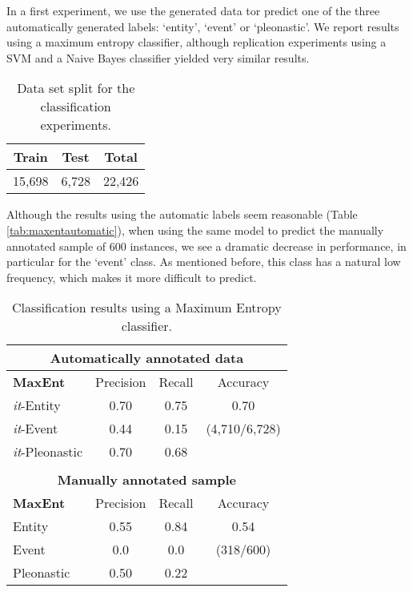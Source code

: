 \documentclass[10pt, a4paper]{article} \usepackage{lrec} \usepackage{multibib}
\begin{document}
In a first experiment, we use the generated data tor predict one of the three automatically generated labels: `entity', `event' or `pleonastic'. We report results using a maximum entropy classifier, although replication experiments using a SVM and a Naive Bayes classifier yielded very similar results. 


\begin{table}[h!]\centering
\begin{tabular}{ccc}
\toprule
\textbf{Train} & \textbf{Test} & \textbf{Total} \\
\midrule
15,698 & 6,728 & 22,426 \\
\bottomrule
\end{tabular}
\caption{Data set split for the classification experiments. }
\end{table}

 Although the results using the automatic labels seem reasonable (Table  \ref{tab:maxentautomatic}), when using the same model to predict the manually annotated sample of 600 instances, we see a dramatic decrease in performance, in particular for the `event' class. As mentioned before, this class has a natural low frequency, which makes it more difficult to predict. 

\begin{center} \begin{table}[h!]\centering 
\begin{tabular}{l ccc}
\multicolumn{4}{c}{ \textbf{Automatically annotated data}}\\ 
\toprule
\textbf{MaxEnt}& Precision & Recall & Accuracy \\ 
\midrule 
\textit{it}-Entity &0.70 & 0.75 &   0.70\\
\textit{it}-Event & 0.44 & 0.15 & (4,710/6,728) \\
\textit{it}-Pleonastic & 0.70 & 0.68&   \\ 
\midrule & & & \\
\multicolumn{4}{c}{\textbf{Manually annotated sample}}  \\ 
\midrule
\textbf{MaxEnt}& Precision & Recall & Accuracy \\ 
\midrule 
Entity &0.55 & 0.84 &0.54\\ 
Event &0.0 & 0.0 & (318/600)\\ 
Pleonastic & 0.50 & 0.22 & \\ 
\bottomrule
\end{tabular} \caption{Classification results using a Maximum Entropy
classifier.} 
\end{table}\label{tab:maxentautomatic}
\end{center}
\end{document}
